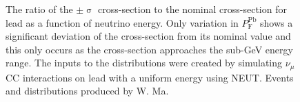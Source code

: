 \begin{figure}%
  \centering
  \hspace{1em}
  \caption{The ratio of the $\pm$$\upsigma$ cross-section to the nominal cross-section for lead as a function of neutrino energy.  Only variation in $P_{\textrm{F}}^{\textrm{Pb}}$ shows a significant deviation of the cross-section from its nominal value and this only occurs as the cross-section approaches the sub-GeV energy range.  The inputs to the distributions  were created by simulating $\nu_\mu$ CC interactions on lead with a uniform energy using NEUT.  Events and distributions produced by W. Ma.}
  \label{fig:PbXSecRatios}
\end{figure}
